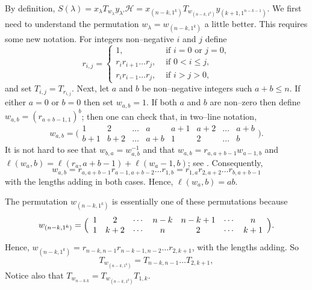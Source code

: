 \documentclass[twoside]{amsart}
\def\If{\text{\ if\ }}
\def\Or{\text{\ or\ }}
\numberwithin{equation}{section}
\theoremstyle{remark}
\def\len(#1){\ell(#1)}
\def\H{\mathscr H}
\begin{document}
By definition,
$S(\lambda)=x_\lambda T_{w_\lambda}y_{\lambda'}\H
           =x_{(n-k,1^k)}T_{w_{(n-k,1^k)}}y_{(k+1,1^{n-k-1})}$.
We first need to understand the permutation $w_\lambda=w_{(n-k,1^k)}$
a little better. This requires some new notation. For integers
non--negative $i$ and $j$ define
$$r_{i,j}=\begin{cases}1,                   &\If i=0\Or j=0,\\
                       r_ir_{i+1}\dots r_j, &\If 0<i\le j,\\
                       r_ir_{i-1}\dots r_j, &\If i>j>0,
\end{cases}$$
and set $T_{i,j}=T_{r_{i,j}}$.  Next, let $a$ and $b$ be non--negative
integers such $a+b\le n$. If either $a=0$ or $b=0$ then set
$w_{a,b}=1$. If both $a$ and $b$ are non--zero then define
$w_{a,b}=(r_{a+b-1,1})^b$; then one can check that, in two--line
notation,
$$w_{a,b}=\Big(\begin{array}{cccc|cccc}
                 1&2&\dots&a&a+1&a+2&\dots&a+b\\
              b+1&b+2&\dots&a+b&1&2&\dots&b
\end{array}\Big).$$
It is not hard to see that $w_{b,a}=w_{a,b}^{-1}$
and that $w_{a,b}=r_{a,a+b-1}w_{a-1,b}$ and 
$\len(w_{a,b})=\len(r_{a,a+b-1})+\len(w_{a-1,b})$; see \cite{DJ:B}. 
Consequently,
$$w_{a,b}=r_{a,a+b-1}r_{a-1,a+b-2}\dots r_{1,b}
         =r_{1,a}r_{2,a+2}\dots r_{b,a+b-1}$$
with the lengths adding in both cases. Hence, $\len(w_{a,b})=ab$.

The permutation $w_{(n-k,1^k)}$ is essentially one of these
permutations because
$$w_{(n-k,1^k)}=\Big(\begin{array}[c]{*7c}
           1&2&\cdots&n-k&n-k+1&\cdots&n\\
           1&k+2&\cdots&n&2&\cdots&k+1
\end{array}\Big).$$
Hence, $w_{(n-k,1^k)}=r_{n-k,n-1}r_{n-k-1,n-2}\dots r_{2,k+1}$, with
the lengths adding. So
$$T_{w_{(n-k,1^k)}}=T_{n-k,n-1}\dots T_{2,k+1},$$ 
Notice also that $T_{w_{n-k.k}}=T_{w_{(n-k,1^k)}}T_{1,k}$.
\end{document}
